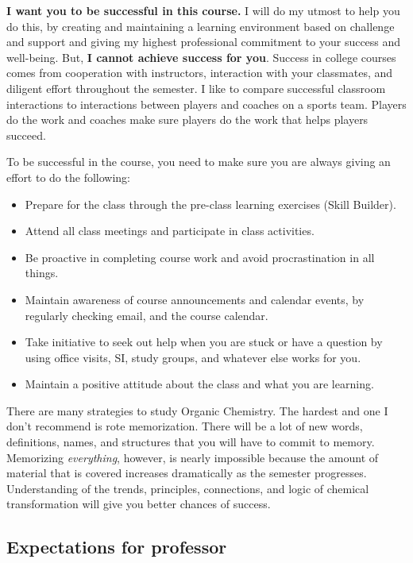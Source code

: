 \textbf{I want you to be successful in this course.} I will do my utmost
to help you do this, by creating and maintaining a learning environment
based on challenge and support and giving my highest professional
commitment to your success and well-being. But, \textbf{I cannot achieve
success for you}. Success in college courses comes from cooperation with
instructors, interaction with your classmates, and diligent effort
throughout the semester. I like to compare successful classroom
interactions to interactions between players and coaches on a sports
team. Players do the work and coaches make sure players do the work that
helps players succeed.

To be successful in the course, you need to make sure you are always
giving an effort to do the following:

\begin{itemize}
\tightlist
\item
  Prepare for the class through the pre-class learning exercises (Skill
  Builder).
\item
  Attend all class meetings and participate in class activities.
\item
  Be proactive in completing course work and avoid procrastination in
  all things.
\item
  Maintain awareness of course announcements and calendar events, by
  regularly checking email, and the course calendar.
\item
  Take initiative to seek out help when you are stuck or have a question
  by using office visits, SI, study groups, and whatever else works for
  you.
\item
  Maintain a positive attitude about the class and what you are
  learning.
\end{itemize}

There are many strategies to study Organic Chemistry. The hardest and
one I don't recommend is rote memorization. There will be a lot of new
words, definitions, names, and structures that you will have to commit
to memory. Memorizing \emph{everything}, however, is nearly impossible
because the amount of material that is covered increases dramatically as
the semester progresses. Understanding of the trends, principles,
connections, and logic of chemical transformation will give you better
chances of success.

\hypertarget{expectations-for-professor}{%
\subsection{Expectations for
professor}\label{expectations-for-professor}}

